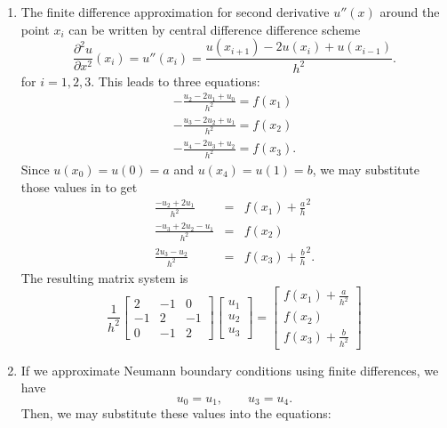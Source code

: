 


\begin{enumerate}
\item The finite difference approximation for second derivative $u''(x)$ around the point $x_i$ can be written by central difference difference scheme
\[
\frac{\partial^2 u}{\partial x^2}(x_i)=u''(x_i)=\frac{u(x_{i+1}) - 2u(x_i) + u(x_{i-1})}{h^2}.
\] 
for $i=1,2,3$.
This leads to three equations:
\begin{eqnarray*}
-\frac{u_{2} - 2u_1 + u_{0}}{h^2} =  f(x_1)\\
-\frac{u_{3} - 2u_2 + u_{1}}{h^2} =  f(x_2)\\
-\frac{u_{4} - 2u_3 + u_{2}}{h^2} =  f(x_3).
\end{eqnarray*}
Since $u(x_0) = u(0) = a$ and $u(x_4) = u(1) = b$, we may substitute those values in to get
\begin{eqnarray*}
\frac{-u_2 + 2u_1}{h^2} &=&  f(x_1) + \frac{a}{h}^2\\
\frac{-u_3 +2u_2 - u_{1}}{h^2} &=&  f(x_2)\\
\frac{2u_3 - u_2}{h^2} &=&  f(x_3) + \frac{b}{h}^2.
\end{eqnarray*}
The resulting matrix system is
\[
\frac{1}{h^2}\left[\begin{array}{ccc}
              2 & -1&0 \\
               -1 & 2 &  -1  \\
                 0 &   -1  & 2 
               \end{array}\right]
               \left[\begin{array}{c}
               u_1\\u_2\\u_3
               \end{array}\right] = 
                              \left[\begin{array}{c}
               f(x_1) + \frac{a}{h^2}\\f(x_2)\\f(x_3) + \frac{b}{h^2}
               \end{array}\right]
\]
\item If we approximate Neumann boundary conditions using finite differences, we have
\[
u_0 = u_1, \qquad u_3 = u_4.
\]
Then, we may substitute these values into the equations:

\end{enumerate}
